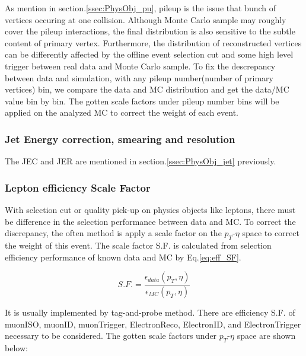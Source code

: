 			As mention in section.\ref{ssec:PhysObj_pu}, pileup is the issue that bunch of vertices occuring at one collision. Although Monte Carlo sample may roughly cover the pileup interactions, the final distribution is also sensitive to the subtle content of primary vertex. Furthermore, the distribution of reconstructed vertices can be differently affected by the offline event selection cut and some high level trigger between real data and Monte Carlo sample. To fix the descrepancy between data and simulation, with any pileup number(number of primary vertices) bin, we compare the data and MC distribution and get the data/MC value bin by bin. The gotten scale factors under pileup number bins will be applied on the analyzed MC to correct the weight of each event.

		\subsubsection{Jet Energy correction, smearing and resolution}
		\label{sssec:DataAndMC_JE_CSR}

			The JEC and JER are mentioned in section.\ref{ssec:PhysObj_jet} previously.

		\subsubsection{Lepton efficiency Scale Factor}
		\label{sssec:DataAndMC_LepEffSF}

		With selection cut or quality pick-up on physics objects like leptons, there must be difference in the selection performance between data and MC. To correct the discrepancy, the often method is apply a scale factor on the $p_T$-$\eta$ space to correct the weight of this event. The scale factor S.F. is calculated from selection efficiency performance of known data and MC by Eq.\ref{eq:eff_SF}. 

		\begin{equation}
		S.F. = \frac{\epsilon_{data}(p_T,\eta)}{\epsilon_{MC}(p_T,\eta)}
		\label{eq:eff_SF}
		\end{equation}

		It is usually implemented by tag-and-probe method\cite{tagandprobe_twiki}. There are efficiency S.F. of muonISO, muonID, muonTrigger, ElectronReco, ElectronID, and ElectronTrigger necessary to be considered. The gotten scale factors under $p_T$-$\eta$ space are shown below:

